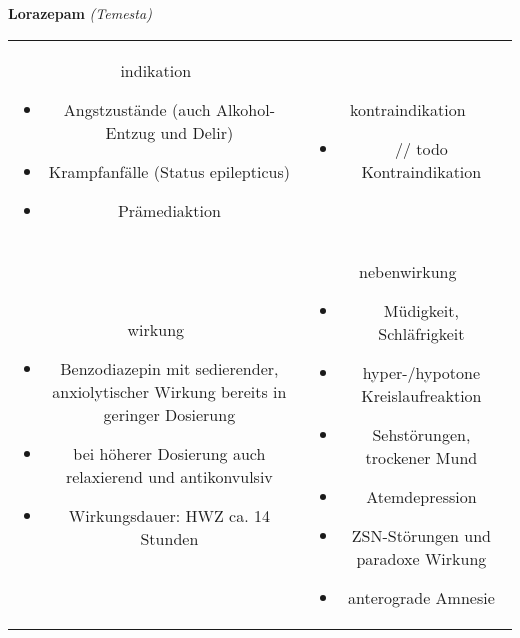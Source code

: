 \begin{frame}{
    \textbf{Lorazepam}
    \textit{(Temesta)}
}
    \begin{tabular}{c c}
        \begin{beamercolorbox}[wd=\boxwidth\textwidth,ht=\boxheight\textheight,sep=1em]{indikation}
            \begin{itemize}
                \item Angstzustände (auch Alkohol-Entzug und Delir)
                \item Krampfanfälle (Status epilepticus)
                \item Prämediaktion
            \end{itemize}
        \end{beamercolorbox} & 
        \begin{beamercolorbox}[wd=\boxwidth\textwidth,ht=\boxheight\textheight,sep=1em]{kontraindikation}
            \begin{itemize}
                \item // todo Kontraindikation 
            \end{itemize}
        \end{beamercolorbox} \\
        \begin{beamercolorbox}[wd=\boxwidth\textwidth,ht=\boxheight\textheight,sep=1em]{wirkung}
            \scriptsize
            \begin{itemize}
                \item Benzodiazepin mit sedierender, anxiolytischer Wirkung bereits in geringer Dosierung
                \item bei höherer Dosierung auch relaxierend und antikonvulsiv
                \item Wirkungsdauer: HWZ ca. 14 Stunden
            \end{itemize}
        \end{beamercolorbox} & 
        \begin{beamercolorbox}[wd=\boxwidth\textwidth,ht=\boxheight\textheight,sep=1em]{nebenwirkung}
            \tiny
            \begin{itemize}
                \item Müdigkeit, Schläfrigkeit
                \item hyper-/hypotone Kreislaufreaktion
                \item Sehstörungen, trockener Mund
                \item Atemdepression
                \item ZSN-Störungen und paradoxe Wirkung
                \item anterograde Amnesie
            \end{itemize}
        \end{beamercolorbox} \\
    \end{tabular}
\end{frame}

